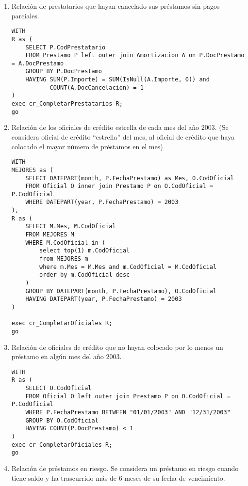 \begin{enumerate}
\item Relación de prestatarios que hayan cancelado sus préstamos sin pagos parciales.
\begin{verbatim}
WITH
R as (
    SELECT P.CodPrestatario
    FROM Prestamo P left outer join Amortizacion A on P.DocPrestamo = A.DocPrestamo
    GROUP BY P.DocPrestamo
    HAVING SUM(P.Importe) = SUM(IsNull(A.Importe, 0)) and
           COUNT(A.DocCancelacion) = 1
)
exec cr_CompletarPrestatarios R;
go
\end{verbatim}

\item Relación de los oficiales de crédito estrella de cada mes del año 2003.
(Se considera oficial de crédito “estrella” del mes, al oficial de crédito
que haya colocado el mayor número de préstamos en el mes)

\begin{verbatim}
WITH
MEJORES as (
    SELECT DATEPART(month, P.FechaPrestamo) as Mes, O.CodOficial
    FROM Oficial O inner join Prestamo P on O.CodOficial = P.CodOficial
    WHERE DATEPART(year, P.FechaPrestamo) = 2003
),
R as (
    SELECT M.Mes, M.CodOficial
    FROM MEJORES M
    WHERE M.CodOficial in (
        select top(1) m.CodOficial
        from MEJORES m
        where m.Mes = M.Mes and m.CodOficial = M.CodOficial
        order by m.CodOficial desc
    )
    GROUP BY DATEPART(month, P.FechaPrestamo), O.CodOficial
    HAVING DATEPART(year, P.FechaPrestamo) = 2003
)

exec cr_CompletarOficiales R;
go
\end{verbatim}


\item Relación de oficiales de crédito que no hayan colocado por lo menos un
préstamo en algún mes del año 2003.

\begin{verbatim}
WITH
R as (
    SELECT O.CodOficial
    FROM Oficial O left outer join Prestamo P on O.CodOficial = P.CodOficial
    WHERE P.FechaPrestamo BETWEEN "01/01/2003" AND "12/31/2003"
    GROUP BY O.CodOficial
    HAVING COUNT(P.DocPrestamo) < 1
)
exec cr_CompletarOficiales R;
go
\end{verbatim}


\item Relación de préstamos en riesgo. Se considera un préstamo en riesgo cuando
tiene saldo y ha trascurrido más de 6 meses de su fecha de vencimiento.


\end{enumerate}
